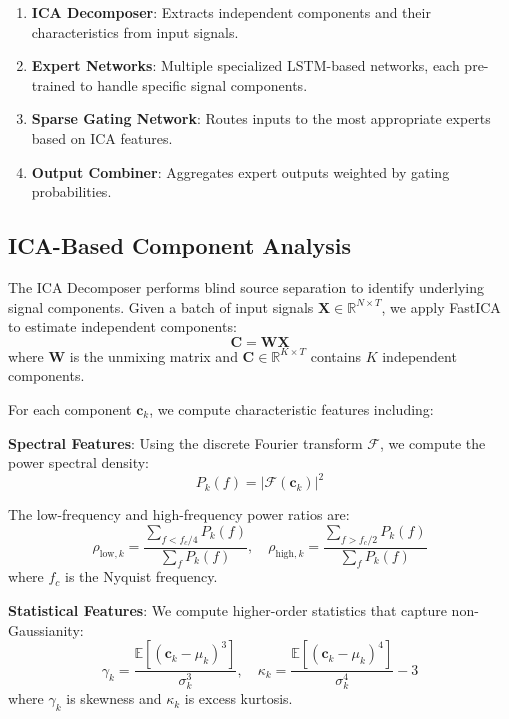 \documentclass{article}
\begin{document}
\begin{enumerate}
\item \textbf{ICA Decomposer}: Extracts independent components and their characteristics from input signals.
\item \textbf{Expert Networks}: Multiple specialized LSTM-based networks, each pre-trained to handle specific signal components.
\item \textbf{Sparse Gating Network}: Routes inputs to the most appropriate experts based on ICA features.
\item \textbf{Output Combiner}: Aggregates expert outputs weighted by gating probabilities.
\end{enumerate}

\subsection{ICA-Based Component Analysis}

The ICA Decomposer performs blind source separation to identify underlying signal components. Given a batch of input signals $\mathbf{X} \in \mathbb{R}^{N \times T}$, we apply FastICA \cite{hyvarinen1999fast} to estimate independent components:
\begin{equation}
\mathbf{C} = \mathbf{W}\mathbf{X}
\end{equation}
where $\mathbf{W}$ is the unmixing matrix and $\mathbf{C} \in \mathbb{R}^{K \times T}$ contains $K$ independent components.

For each component $\mathbf{c}_k$, we compute characteristic features including:

\textbf{Spectral Features}: Using the discrete Fourier transform $\mathcal{F}$, we compute the power spectral density:
\begin{equation}
P_k(f) = |\mathcal{F}(\mathbf{c}_k)|^2
\end{equation}

The low-frequency and high-frequency power ratios are:
\begin{equation}
\rho_{\text{low},k} = \frac{\sum_{f < f_c/4} P_k(f)}{\sum_f P_k(f)}, \quad \rho_{\text{high},k} = \frac{\sum_{f > f_c/2} P_k(f)}{\sum_f P_k(f)}
\end{equation}
where $f_c$ is the Nyquist frequency.

\textbf{Statistical Features}: We compute higher-order statistics that capture non-Gaussianity:
\begin{equation}
\gamma_k = \frac{\mathbb{E}[(\mathbf{c}_k - \mu_k)^3]}{\sigma_k^3}, \quad \kappa_k = \frac{\mathbb{E}[(\mathbf{c}_k - \mu_k)^4]}{\sigma_k^4} - 3
\end{equation}
where $\gamma_k$ is skewness and $\kappa_k$ is excess kurtosis.
\end{document}
